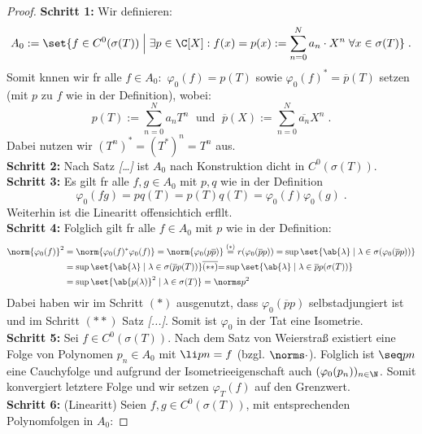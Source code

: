 \begin{proof}
	\textbf{Schritt 1:} Wir definieren:
	\[A_0 := \set{f \in C^0(\sigma(T)) \;\Big\vert\; \exists p \in \C[X]: f(x) = p(x):= \sum_{n=0}^N a_n \cdot X^n \;\forall x \in \sigma(T) }\;.\]
	Somit k\os nnen wir f\us r alle  \(f \in A_0:\) \(\varphi_0 (f) = p(T)\) sowie \(\varphi_0(f)^* = \overline{p}(T)\) setzen (mit $p$ zu $f$ wie in der Definition), wobei:
	\[p(T) := \sum_{n=0}^N a_n T^n\; \text{ und }\;\overline{p}(X) := \sum_{n=0}^N \overline{a_n}X^n \;.\]
	Dabei nutzen wir \((T^n)^* = (T^*)^n = T^n\) aus.\\
	\textbf{Schritt 2:} Nach Satz \textit{[\ldots]} ist $A_0$ nach Konstruktion dicht in \(C^0(\sigma(T))\).\\
	\textbf{Schritt 3:} Es gilt f\us r alle \(f, g \in A_0\) mit $p, q$ wie in der Definition
	\[ \varphi_0(fg) = pq(T) =  p(T) q(T) = \varphi_0(f)\varphi_0(g)\;.\]
	Weiterhin ist die Linearit\as t offensichtich erf\us llt. \\
	\textbf{Schritt 4:} Folglich gilt f\us r alle $f \in A_0$ mit $p$ wie in der Definition:
	\begin{align*}
	\norm{\varphi_0(f)}^2 &= \norm{\varphi_0(f)^* \varphi_0(f)} = \norm{\varphi_0(p \overline{p})} \overset{(*)}{=} r(\varphi_0(\overline p p )) = \sup\set{\ab{\lambda} \;\vert\; \lambda \in \sigma(\varphi_0(\overline p p ))} \\
	&  = \sup\set{\ab{\lambda} \;\vert\; \lambda \in \sigma(\overline p p (T))} \overline{(**)}{=} \sup\set{\ab{\lambda} \;\vert\; \lambda \in \overline p p (\sigma(T))}\\& = \sup\set{\ab{p(\lambda)}^2 \;\vert\; \lambda \in \sigma(T)}  = \norms p ^2
	\end{align*}
	Dabei haben wir im Schritt \((*)\) ausgenutzt, dass \(\varphi_0(\overline p p )\) selbstadjungiert ist und im Schritt \((**)\) Satz \textit{[...]}. Somit ist $\varphi_0$ in der Tat eine Isometrie. \\
	\textbf{Schritt 5:} Sei \(f\in C^0(\sigma(T))\). Nach dem Satz von Weierstra\ss{} existiert eine Folge von Polynomen \(p_n \in A_0\) mit \(\li pn = f\) (bzgl. \(\norms\cdot\)). Folglich ist \(\seq pn \) eine Cauchyfolge und aufgrund der Isometrieeigenschaft auch \((\varphi_0(p_n))_{n\in\N}\). Somit konvergiert letztere Folge und wir setzen \(\varphi_T(f)\) auf den Grenzwert.\\
	\textbf{Schritt 6:} (Linearit\as t) Seien \(f,g \in C^0(\sigma(T))\), mit entsprechenden Polynomfolgen in $A_0$: 

\end{proof}
